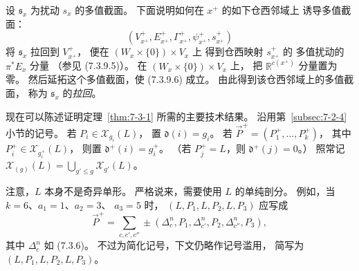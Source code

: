 
设 $\mathfrak s_x$ 为扰动 $s_x$ 的多值截面。
下面说明如何在 $x^+$ 的如下仓西邻域上
诱导多值截面：
\[
(V_{x^+}^+,E_{x^+}^+,\Gamma_{x^+}^+,
\psi_{x^+}^+,s_{x^+}^+)
\]
将 $\mathfrak s_x$ 拉回到 $V_{x^+}^+$，
便在 $(W_x\times\{0\})\times V_x$ 上
得到仓西映射 $s_{x^+}^+$ 的
多值扰动的 $\pi^*E_x$ 分量
（参见 (7.3.9.5)）。
在 $(W_x\times\{0\})\times V_x$ 上，
把 $\mathbb R^{c(x^+)}$ 分量置为零。
然后延拓这个多值截面，使 (7.3.9.6) 成立。
由此得到该仓西邻域上的多值截面，
称为 $\mathfrak s_x$ 的\emph{拉回}。

现在可以陈述证明定理~\ref{thm:7-3-1}
所需的主要技术结果。
沿用第~\ref{subsec:7-2-4} 小节的记号。
若 $P_i\in\mathcal X_{g_i}(L)$，
置 $\mathfrak d(i)=g_i$。
若 $\vec P^+=(P_1^+,\ldots,P_k^+)$，
其中 $P_i^+\in\mathcal X_{g_i^+}(L)$，
则置 $\mathfrak d^+(i)=g_i^+$。
（若 $P_j^+=L$，则 $\mathfrak d^+(j)=0$。）
照常记
$\mathcal X_{(g)}(L)=\bigcup_{g'\le g}\mathcal X_{g'}(L)$。

注意，$L$ 本身不是奇异单形。
严格说来，需要使用 $L$ 的单纯剖分。
例如，当 $k=6$、$a_1=1$、$a_2=3$、
$a_3=5$ 时，
$(L,P_1,L,P_2,L,P_3)$ 应写成
\[
\vec P^+
=\sum_{c,c',c''}\pm
(\Delta_c^n,P_1,\Delta_{c'}^n,P_2,
\Delta_{c''}^n,P_3),
\]
其中 $\Delta_c^n$ 如 (7.3.6)。
不过为简化记号，下文仍略作记号滥用，
简写为 $(L,P_1,L,P_2,L,P_3)$。


